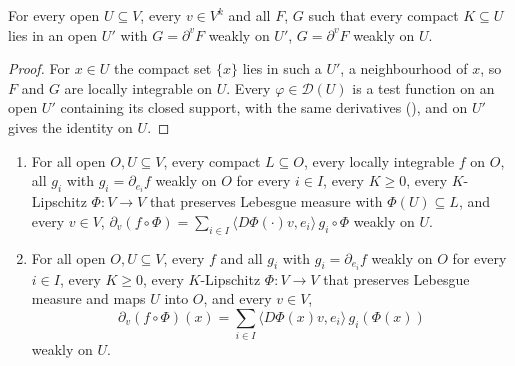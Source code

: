 \begin{lemma}
\label{lem:weak-derivative-local-to-global}
\leanok
{}
For every open $U \subseteq V$, every $v \in V^k$ and all $F$, $G$ such that every compact
$K \subseteq U$ lies in an open $U'$ with $G = \partial^v F$ weakly on $U'$,
$G = \partial^v F$ weakly on $U$.
\end{lemma}

\begin{proof}
\leanok
For $x \in U$ the compact set $\{x\}$ lies in such a $U'$, a neighbourhood of $x$, so $F$ and $G$
are locally integrable on $U$. Every $\varphi \in \mathcal D(U)$ is a test function on an open
$U'$ containing its closed support, with the same derivatives
(), and  on $U'$
gives the identity on $U$.
\end{proof}

\begin{theorem}
\label{thm:weak-derivative-chain-rule}
\leanok
{}
\begin{enumerate}
  \item For all open $O, U \subseteq V$, every compact $L \subseteq O$, every locally integrable
    $f$ on $O$, all $g_i$ with $g_i = \partial_{e_i} f$ weakly on $O$ for every $i \in I$, every
    $K \geq 0$, every $K$-Lipschitz $\Phi \colon V \to V$ that preserves Lebesgue measure with
    $\Phi(U) \subseteq L$, and every $v \in V$,
    $\partial_v (f \circ \Phi) = \sum_{i \in I} \langle D\Phi(\cdot) v, e_i \rangle \,
    g_i \circ \Phi$ weakly on $U$.
  \item For all open $O, U \subseteq V$, every $f$ and all $g_i$ with $g_i = \partial_{e_i} f$
    weakly on $O$ for every $i \in I$, every $K \geq 0$, every $K$-Lipschitz
    $\Phi \colon V \to V$ that preserves Lebesgue measure and maps $U$ into $O$, and every
    $v \in V$,
    \[
      \partial_v (f \circ \Phi)(x) = \sum_{i \in I} \langle D\Phi(x) v, e_i \rangle \,
      g_i(\Phi(x))
    \]
    weakly on $U$.
\end{enumerate}
\end{theorem}

